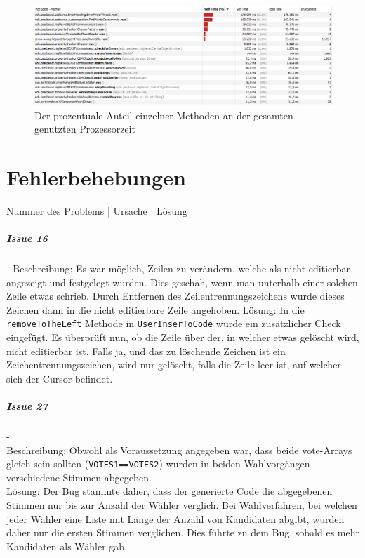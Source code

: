 \documentclass[a4paper]{scrreprt}
\begin{document}
\begin{figure}[ht]
	\centering
  \includegraphics[width=1.0\textwidth,
  height=0.40\textwidth]{images/BEAST_PROCESSORTIME.png} \caption{Der
  prozentuale Anteil einzelner Methoden an der gesamten genutzten Prozessorzeit}
	\label{fig5}
\end{figure}

\chapter{Fehlerbehebungen}

Nummer des Problems | Ursache | Lösung

\paragraph{Issue 16}- \newline
Beschreibung: Es war möglich, Zeilen zu verändern, welche als nicht editierbar angezeigt und festgelegt wurden. Dies geschah, wenn man unterhalb einer solchen Zeile etwas schrieb. Durch Entfernen des Zeilentrennungszeichens wurde dieses Zeichen dann in die nicht editierbare Zeile angehoben.
\newline
Lösung: In die \verb!removeToTheLeft! Methode in \verb!UserInserToCode! wurde ein zusätzlicher Check eingefügt. Es überprüft nun, ob die Zeile über der, in welcher etwas gelöscht wird, nicht editierbar ist. Falls ja, und das zu löschende Zeichen ist ein Zeichentrennungszeichen, wird nur gelöscht, falls die Zeile leer ist, auf welcher sich der Cursor befindet.

\paragraph{Issue 27}- \\
Beschreibung: Obwohl als Voraussetzung angegeben war, dass beide vote-Arrays gleich sein sollten (\verb!VOTES1==VOTES2!) wurden in beiden Wahlvorgängen verschiedene Stimmen abgegeben.\\
Lösung: Der Bug stammte daher, dass der generierte Code die abgegebenen Stimmen nur bis zur Anzahl der Wähler verglich. Bei Wahlverfahren, bei welchen jeder Wähler eine Liste mit Länge der Anzahl von Kandidaten abgibt, wurden daher nur die ersten Stimmen verglichen. Dies führte zu dem Bug, sobald es mehr Kandidaten als Wähler gab.
\end{document}
